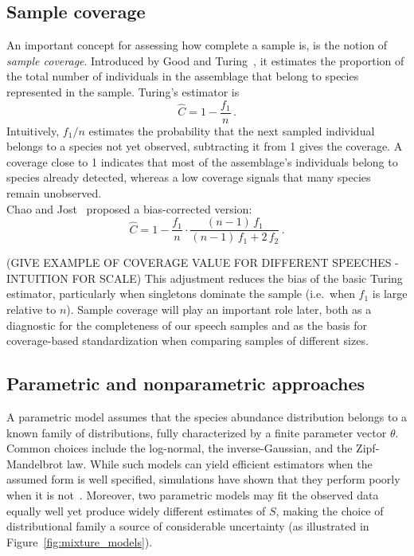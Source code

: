\documentclass{article}
\begin{document}
\subsection{Sample coverage}\label{subsec:coverage}
 
An important concept for assessing how complete a sample is, is the notion of \emph{sample coverage}. Introduced by Good and Turing~\cite{good1953}, it estimates the proportion of the total number of individuals in the assemblage that belong to species represented in the sample. Turing's estimator is
\begin{equation}\label{eq:coverage_turing}
    \hat{C} = 1 - \frac{f_1}{n}\,.
\end{equation}
Intuitively, $f_1/n$ estimates the probability that the next sampled individual belongs to a species not yet observed, subtracting it from 1 gives the coverage. A coverage close to 1 indicates that most of the assemblage's individuals belong to species already detected, whereas a low coverage signals that many species remain unobserved.\\

Chao and Jost~\cite{chaojost2012} proposed a bias-corrected version:
\begin{equation}\label{eq:coverage_chaojost}
    \hat{C} = 1 - \frac{f_1}{n} \cdot 
    \frac{(n-1)\,f_1}{(n-1)\,f_1 + 2\,f_2}\,.
\end{equation}

(GIVE EXAMPLE OF COVERAGE VALUE FOR DIFFERENT SPEECHES - INTUITION FOR SCALE)
This adjustment reduces the bias of the basic Turing estimator, particularly when singletons dominate the sample (i.e.\ when $f_1$ is large relative to $n$). Sample coverage will play an important role later, both as a diagnostic for the completeness of our speech samples and as the basis for coverage-based standardization when comparing samples of different sizes.\\

\subsection{Parametric and nonparametric approaches}

A parametric model assumes that the species abundance distribution belongs to a known family of distributions, fully characterized by a finite parameter vector $\theta$. Common choices include the log-normal, the inverse-Gaussian, and the Zipf-Mandelbrot law. While such models can yield efficient estimators when the assumed form is well specified, simulations have shown that they perform poorly when it is not~\cite{chao2016species}. Moreover, two parametric models may fit the observed data equally well yet produce widely different estimates of $S$, making the choice of distributional family a source of considerable uncertainty (as illustrated in Figure~\ref{fig:mixture_models}).
\end{document}

